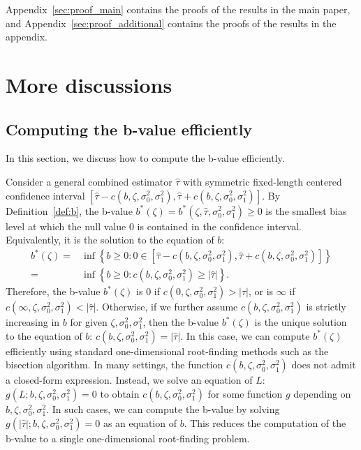 \documentclass[11pt]{article}
\numberwithin{equation}{section}
\theoremstyle{definition}
\begin{document}
Appendix~\ref{sec:proof_main} contains the proofs of the results in the main paper, and Appendix~\ref{sec:proof_additional} contains the proofs of the results in the appendix.


\section{More discussions}\label{sec:discussions}


\subsection{Computing the b-value efficiently}\label{sec:bvalue}

In this section, we discuss how to compute the b-value efficiently.

Consider a general combined estimator $\hat\tau$ with symmetric fixed-length centered confidence interval $[\hat\tau - c(b,\zeta, \sigma_0^2, \sigma_1^2), \hat\tau + c(b,\zeta, \sigma_0^2, \sigma_1^2)]$. By Definition~\ref{def:b}, the b-value $b^*(\zeta)  = b^*(\zeta, \hat\tau, \sigma_0^2, \sigma_1^2) \ge 0$ is the smallest bias level at which the null value $0$ is contained in the confidence interval. Equivalently, it is the solution to the equation of $b$:
\begin{align*}
  b^*(\zeta) =& \inf\left\{b \ge 0: 0 \in [\hat\tau - c(b,\zeta, \sigma_0^2, \sigma_1^2), \hat\tau + c(b,\zeta, \sigma_0^2, \sigma_1^2)]\right\} \\
  =& \inf\left\{b \ge 0: c(b,\zeta, \sigma_0^2, \sigma_1^2) \ge \lvert \hat\tau \rvert\right\}.
\end{align*}
Therefore, the b-value $b^*(\zeta)$ is $0$ if $c(0,\zeta, \sigma_0^2, \sigma_1^2) > \lvert \hat\tau \rvert$, or is $\infty$ if $c(\infty,\zeta, \sigma_0^2, \sigma_1^2) < \lvert \hat\tau \rvert$. Otherwise, if we further assume $c(b,\zeta, \sigma_0^2, \sigma_1^2)$ is strictly increasing in $b$ for given $\zeta, \sigma_0^2, \sigma_1^2$, then the b-value $b^*(\zeta)$ is the unique solution to the equation of $b$: $c(b, \zeta, \sigma_0^2, \sigma_1^2) = \lvert \hat\tau \rvert$. In this case, we can compute $b^*(\zeta)$ efficiently using standard one-dimensional root-finding methods such as the bisection algorithm. In many settings, the function $c(b,\zeta,\sigma_0^2,\sigma_1^2)$ does not admit a closed-form expression. Instead, we solve an equation of $L$: $g(L;b,\zeta, \sigma_0^2, \sigma_1^2) = 0$ to obtain $c(b,\zeta,\sigma_0^2,\sigma_1^2)$ for some function $g$ depending on $b, \zeta, \sigma_0^2, \sigma_1^2$. In such cases, we can compute the b-value by solving $g(\lvert \hat\tau \rvert;b,\zeta, \sigma_0^2, \sigma_1^2) = 0$ as an equation of $b$. This reduces the computation of the b-value to a single one-dimensional root-finding problem.
\end{document}
